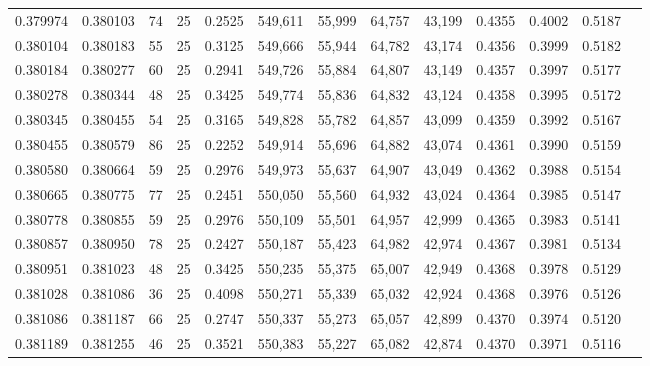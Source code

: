 \begin{tabular}{rrrrrrrrrrrrr}
0.379974 & 0.380103 &    74 &  25 &                                     0.2525 & 549,611 &  55,999 &  64,757 &  43,199 & 0.4355 & 0.4002 & 0.5187 \\
0.380104 & 0.380183 &    55 &  25 &                                     0.3125 & 549,666 &  55,944 &  64,782 &  43,174 & 0.4356 & 0.3999 & 0.5182 \\
0.380184 & 0.380277 &    60 &  25 &                                     0.2941 & 549,726 &  55,884 &  64,807 &  43,149 & 0.4357 & 0.3997 & 0.5177 \\
0.380278 & 0.380344 &    48 &  25 &                                     0.3425 & 549,774 &  55,836 &  64,832 &  43,124 & 0.4358 & 0.3995 & 0.5172 \\
0.380345 & 0.380455 &    54 &  25 &                                     0.3165 & 549,828 &  55,782 &  64,857 &  43,099 & 0.4359 & 0.3992 & 0.5167 \\
0.380455 & 0.380579 &    86 &  25 &                                     0.2252 & 549,914 &  55,696 &  64,882 &  43,074 & 0.4361 & 0.3990 & 0.5159 \\
0.380580 & 0.380664 &    59 &  25 &                                     0.2976 & 549,973 &  55,637 &  64,907 &  43,049 & 0.4362 & 0.3988 & 0.5154 \\
0.380665 & 0.380775 &    77 &  25 &                                     0.2451 & 550,050 &  55,560 &  64,932 &  43,024 & 0.4364 & 0.3985 & 0.5147 \\
0.380778 & 0.380855 &    59 &  25 &                                     0.2976 & 550,109 &  55,501 &  64,957 &  42,999 & 0.4365 & 0.3983 & 0.5141 \\
0.380857 & 0.380950 &    78 &  25 &                                     0.2427 & 550,187 &  55,423 &  64,982 &  42,974 & 0.4367 & 0.3981 & 0.5134 \\
0.380951 & 0.381023 &    48 &  25 &                                     0.3425 & 550,235 &  55,375 &  65,007 &  42,949 & 0.4368 & 0.3978 & 0.5129 \\
0.381028 & 0.381086 &    36 &  25 &                                     0.4098 & 550,271 &  55,339 &  65,032 &  42,924 & 0.4368 & 0.3976 & 0.5126 \\
0.381086 & 0.381187 &    66 &  25 &                                     0.2747 & 550,337 &  55,273 &  65,057 &  42,899 & 0.4370 & 0.3974 & 0.5120 \\
0.381189 & 0.381255 &    46 &  25 &                                     0.3521 & 550,383 &  55,227 &  65,082 &  42,874 & 0.4370 & 0.3971 & 0.5116 \\

\end{tabular}
